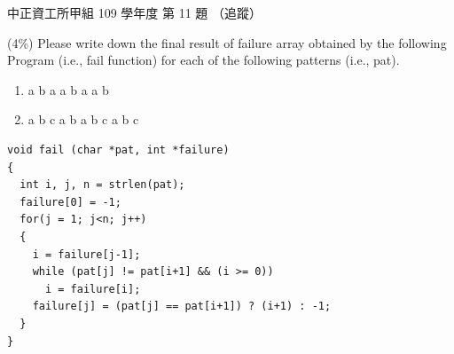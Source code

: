 \begin{pastexam}[label={px:ccu-109-swa-06}]{中正資工所甲組 109 學年度 第 11 題}
（追蹤）

(4\%) Please write down the final result of failure array obtained by the following Program (i.e.,
fail function) for each of the following patterns (i.e., pat).
\begin{enumerate}[label=(\alph*)]
\item a b a a b a a b
\item a b c a b a b c a b c
\end{enumerate}
\begin{verbatim}
void fail (char *pat, int *failure)
{
  int i, j, n = strlen(pat);
  failure[0] = -1;
  for(j = 1; j<n; j++)
  {
    i = failure[j-1];
    while (pat[j] != pat[i+1] && (i >= 0))
      i = failure[i];
    failure[j] = (pat[j] == pat[i+1]) ? (i+1) : -1;
  }
}
\end{verbatim}
\end{pastexam}

